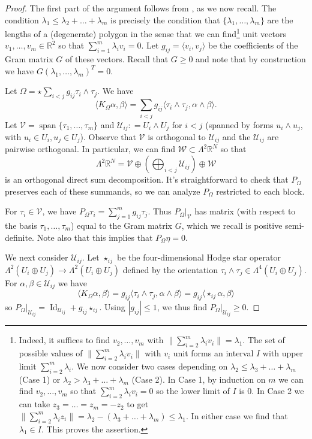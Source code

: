 \documentclass[11pt]{amsart}
\numberwithin{equation}{section}
\theoremstyle{plain}
\theoremstyle{definition}
\theoremstyle{remark}
\newcommand{\R}{\mathbb{R}}
\DeclareMathOperator{\Id}{Id}
\newcommand{\Vcal}{\mathcal V}
\newcommand{\Ucal}{\mathcal U}
\newcommand{\Wcal}{\mathcal W}
\DeclareMathOperator{\Span}{span}
\newcommand{\bangle}[1]{\langle #1 \rangle}
\begin{document}
\begin{proof}
The first part of the argument follows from \cite[Theorem 3.4]{SCPW}, as we now recall. The condition $\lambda_1\leq \lambda_2+\dots+\lambda_m$ is precisely the condition that $\{\lambda_1,\dots,\lambda_m\}$ are the lengths of a (degenerate) polygon in the sense that we can find\footnote{Indeed, it suffices to find $v_2,\dots, v_m$ with $\|\sum_{i=2}^m \lambda_i v_i \|=\lambda_1$. The set of possible values of $\|\sum_{i=2}^m \lambda_i  v_i \|$ with $ v_i$ unit forms an interval $I$ with upper limit $\sum_{i=2}^m \lambda_i$. We now consider two cases depending on $\lambda_2 \leq \lambda_3+\dots + \lambda_m$ (Case 1) or $\lambda_2 > \lambda_3+\dots + \lambda_m$ (Case 2). In Case 1, by induction on $m$ we can find $v_2,\dots,v_m$ so that $\sum_{i=2}^m \lambda_i  v_i  = 0$ so the lower limit of $I$ is $0$. In Case 2 we can take $ z_3=\dots= z_m = -  z_2$ to get $\|\sum_{i=2}^m \lambda_i z_i\|  = \lambda_2 - (\lambda_3 + \dots + \lambda_m) \leq \lambda_1$. In either case we find that $\lambda_1 \in I$. This proves the assertion.} unit vectors $v_1,\dots,v_m \in \R^2$ so that $\sum_{i=1}^m \lambda_i v_i = 0$. Let $g_{ij} = \bangle{v_i,v_j}$ be the coefficients of the Gram matrix $G$ of these vectors. Recall that $G\geq 0$ and note that by construction we have $G(\lambda_1,\dots,\lambda_m)^T = 0$. 

Let $\Omega = \star \sum_{i<j} g_{ij} \tau_i \wedge \tau_j$. We have
\[
\bangle{K_\Omega \alpha,\beta}  = \sum_{i<j} g_{ij} \bangle{\tau_i\wedge \tau_j,\alpha \wedge \beta}. 
\]
Let $\Vcal =\Span\{\tau_1,\dots,\tau_m\}$ and $\Ucal_{ij} : = U_i \wedge U_j$ for $i<j$ (spanned by forms $u_i\wedge u_j$, with $u_i \in U_i,u_j \in U_j$). Observe that $\Vcal$ is orthogonal to $\Ucal_{ij}$ and the $\Ucal_{ij}$ are pairwise orthogonal. In particular, we can find $\Wcal \subset \Lambda^2\R^N$ so that
\[
\Lambda^2 \R^N = \Vcal \oplus \left(\bigoplus_{i<j} \Ucal_{ij} \right) \oplus \Wcal
\]
is an orthogonal direct sum decomposition. It's straightforward to check that $P_\Omega$ preserves each of these summands, so we can analyze $P_\Omega$ restricted to each block. 

For $\tau_i \in \Vcal$, we have $P_\Omega \tau_i  = \sum_{j=1}^m g_{ij} \tau_j$. Thus $P_\Omega|_{\Vcal}$ has matrix (with respect to the basis $\tau_1,\dots,\tau_m$) equal to the Gram matrix $G$, which we recall is positive semi-definite. Note also that this implies that $P_\Omega \eta = 0$.  

We next consider $\Ucal_{ij}$. Let $\star_{ij}$ be the four-dimensional Hodge star operator $\Lambda^2 (U_i\oplus U_j) \to \Lambda^2 (U_i\oplus U_j) $ defined by the orientation $\tau_i\wedge \tau_j \in \Lambda^4(U_i \oplus U_j)$. For $\alpha,\beta \in \Ucal_{ij}$ we have
\[
\bangle{K_\Omega\alpha,\beta} = g_{ij} \bangle{\tau_i\wedge \tau_j, \alpha\wedge \beta} = g_{ij} \bangle{ \star_{ij} \alpha, \beta}
\]
so $P_\Omega|_{\Ucal_{ij}}= \Id_{\Ucal_{ij}} + g_{ij} \star_{ij}$. Using $|g_{ij}| \leq 1$,  we thus find $P_\Omega|_{\Ucal_{ij}} \geq 0$. 


\end{proof}
\end{document}
